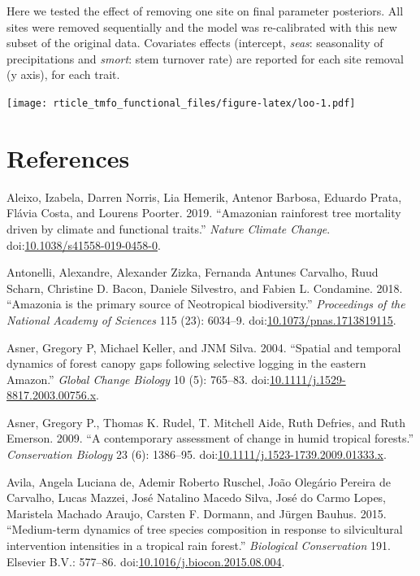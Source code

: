 \documentclass[]{elsarticle} %
\begin{document}
Here we tested the effect of removing one site on final parameter
posteriors. All sites were removed sequentially and the model was
re-calibrated with this new subset of the original data. Covariates
effects (intercept, \emph{seas}: seasonality of precipitations and
\emph{smort}: stem turnover rate) are reported for each site removal (y
axis), for each trait.

\texttt{[image: rticle\_tmfo\_functional\_files/figure-latex/loo-1.pdf]}

\section*{References}\label{references}

\hypertarget{refs}{}
\hypertarget{ref-Aleixo2019}{}
Aleixo, Izabela, Darren Norris, Lia Hemerik, Antenor Barbosa, Eduardo
Prata, Flávia Costa, and Lourens Poorter. 2019. ``Amazonian rainforest
tree mortality driven by climate and functional traits.'' \emph{Nature
Climate Change}.
doi:\href{https://doi.org/10.1038/s41558-019-0458-0}{10.1038/s41558-019-0458-0}.

\hypertarget{ref-Antonelli2018}{}
Antonelli, Alexandre, Alexander Zizka, Fernanda Antunes Carvalho, Ruud
Scharn, Christine D. Bacon, Daniele Silvestro, and Fabien L. Condamine.
2018. ``Amazonia is the primary source of Neotropical biodiversity.''
\emph{Proceedings of the National Academy of Sciences} 115 (23):
6034--9.
doi:\href{https://doi.org/10.1073/pnas.1713819115}{10.1073/pnas.1713819115}.

\hypertarget{ref-Asner2004}{}
Asner, Gregory P, Michael Keller, and JNM Silva. 2004. ``Spatial and
temporal dynamics of forest canopy gaps following selective logging in
the eastern Amazon.'' \emph{Global Change Biology} 10 (5): 765--83.
doi:\href{https://doi.org/10.1111/j.1529-8817.2003.00756.x}{10.1111/j.1529-8817.2003.00756.x}.

\hypertarget{ref-Asner2009}{}
Asner, Gregory P., Thomas K. Rudel, T. Mitchell Aide, Ruth Defries, and
Ruth Emerson. 2009. ``A contemporary assessment of change in humid
tropical forests.'' \emph{Conservation Biology} 23 (6): 1386--95.
doi:\href{https://doi.org/10.1111/j.1523-1739.2009.01333.x}{10.1111/j.1523-1739.2009.01333.x}.

\hypertarget{ref-DeAvila2015}{}
Avila, Angela Luciana de, Ademir Roberto Ruschel, João Olegário Pereira
de Carvalho, Lucas Mazzei, José Natalino Macedo Silva, José do Carmo
Lopes, Maristela Machado Araujo, Carsten F. Dormann, and Jürgen Bauhus.
2015. ``Medium-term dynamics of tree species composition in response to
silvicultural intervention intensities in a tropical rain forest.''
\emph{Biological Conservation} 191. Elsevier B.V.: 577--86.
doi:\href{https://doi.org/10.1016/j.biocon.2015.08.004}{10.1016/j.biocon.2015.08.004}.
\end{document}
